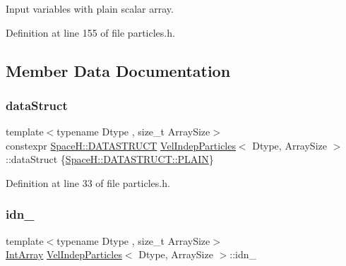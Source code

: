 Input variables with plain scalar array. 



Definition at line 155 of file particles.\+h.



\subsection{Member Data Documentation}
\mbox{\label{class_vel_indep_particles_a6d357b21c216a2b079b1927c18de0b8f}} 
\subsubsection{\texorpdfstring{data\+Struct}{dataStruct}}
{\footnotesize\ttfamily template$<$typename Dtype , size\+\_\+t Array\+Size$>$ \\
constexpr \mbox{\hyperlink{namespace_space_h_a4782f089179a3c269891f02482b072df}{Space\+H\+::\+D\+A\+T\+A\+S\+T\+R\+U\+CT}} \mbox{\hyperlink{class_vel_indep_particles}{Vel\+Indep\+Particles}}$<$ Dtype, Array\+Size $>$\+::data\+Struct \{\mbox{\hyperlink{namespace_space_h_a0af19f79a6498e99dbda772053d44a72af62eb0bf5e5c72e80983fbbac1cb70e5}{Space\+H\+::\+D\+A\+T\+A\+S\+T\+R\+U\+C\+T\+::\+P\+L\+A\+IN}}\}\hspace{0.3cm}{\ttfamily [static]}}



Definition at line 33 of file particles.\+h.

\mbox{\label{class_vel_indep_particles_aeccde2c19380b79eb6be4f28d6077526}} 
\subsubsection{\texorpdfstring{idn\+\_\+}{idn\_}}
{\footnotesize\ttfamily template$<$typename Dtype , size\+\_\+t Array\+Size$>$ \\
\mbox{\hyperlink{class_vel_indep_particles_a5e4f20d435c71a5f4179143206258a81}{Int\+Array}} \mbox{\hyperlink{class_vel_indep_particles}{Vel\+Indep\+Particles}}$<$ Dtype, Array\+Size $>$\+::idn\+\_\+\hspace{0.3cm}{\ttfamily [protected]}}



